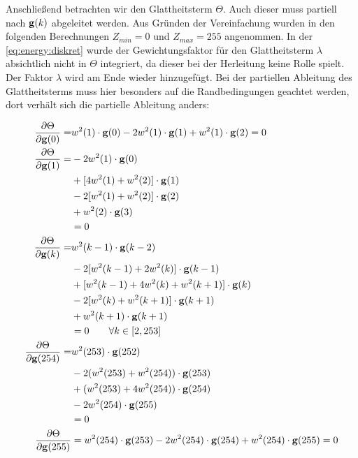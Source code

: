 Anschließend betrachten wir den Glattheitsterm $\Theta$. Auch dieser muss partiell nach $\mathbf g(k)$ abgeleitet werden. Aus Gründen der Vereinfachung wurden in den folgenden Berechnungen $Z_{min} = 0$ und $Z_{max} = 255$ angenommen. In der \autoref{eq:energy:diskret} wurde der Gewichtungsfaktor für den Glattheitsterm $\lambda$ absichtlich nicht in $\Theta$ integriert, da dieser bei der Herleitung keine Rolle spielt. Der Faktor $\lambda$ wird am Ende wieder hinzugefügt. Bei der partiellen Ableitung des Glattheitsterms muss hier besonders auf die Randbedingungen geachtet werden, dort verhält sich die partielle Ableitung anders:

\begin{align}
\label{eq:partials:smoothness:0}
\frac{\partial \Theta}{\partial \mathbf g(0)} =& w^2(1)\cdot \mathbf g(0) -2w^2(1)\cdot \mathbf g(1) + w^2(1)\cdot \mathbf g(2) = 0\\
\label{eq:partials:smoothness:1}
\frac{\partial \Theta}{\partial \mathbf g(1)} = &-2w^2(1)\cdot \mathbf g(0) \nonumber \\
        &+[4w^2(1)+w^2(2)]\cdot \mathbf g(1) \nonumber \\
        &- 2 [w^2(1)+w^2(2)]\cdot \mathbf g(2) \nonumber \\
        &+ w^2(2)\cdot \mathbf g(3) \nonumber \\
        &= 0\\
\label{eq:partials:smoothness:k}
\frac{\partial \Theta}{\partial \mathbf g(k)} =& 
        w^2(k-1)\cdot \mathbf g(k-2)\nonumber\\
        &- 2[w^2(k-1)+2w^2(k)]\cdot \mathbf g(k-1) \nonumber\\
        &+ [w^2(k-1)+4w^2(k)+w^2(k+1)]\cdot \mathbf g(k)\nonumber\\ 
        &- 2[w^2(k)+w^2(k+1)] \cdot \mathbf g(k+1) \nonumber\\
        &+ w^2(k+1)\cdot \mathbf g(k+1) \nonumber\\
        &=0 \qquad \forall k \in [2,253]\\
\label{eq:partials:smoothness:254}
\frac{\partial \Theta}{\partial \mathbf g(254)} =& w^2(253)\cdot \mathbf g(252) \nonumber \\
        & -2 (w^2(253)+w^2(254))\cdot \mathbf g(253) \nonumber \\
        & +(w^2(253)+4 w^2(254)) \cdot \mathbf g(254)\nonumber \\
        & -2 w^2(254)\cdot \mathbf g(255)\nonumber \\ 
        &= 0\\
\label{eq:partials:smoothness:255}
\frac{\partial \Theta}{\partial \mathbf g(255)} &= 
    w^2(254)\cdot \mathbf g(253) 
    - 2 w^2(254)\cdot \mathbf g(254) 
    + w^2(254)\cdot \mathbf g(255)= 0
\end{align}


